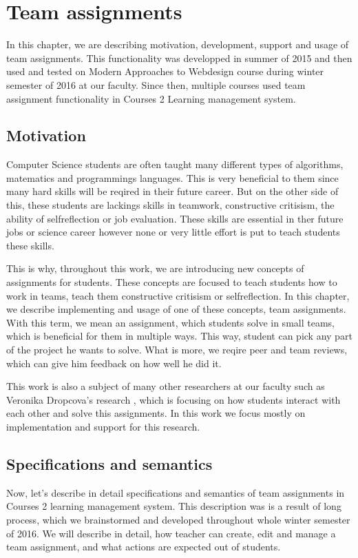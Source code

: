 \chapter{Team assignments}

In this chapter, we are describing motivation, development, support and usage of team assignments. This functionality was developped in summer of 2015 and then used and tested on Modern Approaches to Webdesign course during winter semester of 2016 at our faculty. Since then, multiple courses used team assignment functionality in Courses 2 Learning management system.

\section{Motivation}

Computer Science students are often taught many different types of algorithms, matematics and programmings languages. This is very beneficial to them since many hard skills will be reqired in their future career. But on the other side of this, these students are lackings skills in teamwork, constructive critisism, the ability of self\-reflection or job evaluation.  These skills are essential in ther future jobs or science career however none or very little effort is put to teach students these skills. 


This is why, throughout this work, we are introducing new concepts of assignments for students. These concepts are focused to teach students how to work in teams, teach them constructive critisism or self\-reflection. In this chapter, we describe implementing and usage of one of these concepts, team assignments. With this term, we mean an assignment, which students solve in small teams, which is beneficial for them in multiple ways. This way, student can pick any part of the project he wants to solve. What is more, we reqire peer and team reviews, which can give him feedback on how well he did it. 

This work is also a subject of many other researchers at our faculty such as Veronika Dropcova's research \cite{dropcova}, which is focusing on how students interact with each other and solve this assignments. In this work we focus mostly on implementation and support for this research.


\section{Specifications and semantics}
Now, let's describe in detail specifications and semantics of team assignments in Courses 2 learning management system. This description was is a result of long process, which we brainstormed and developed throughout whole winter semester of 2016. We will describe in detail, how teacher can create, edit and manage a team assignment, and what actions are expected out of students.

